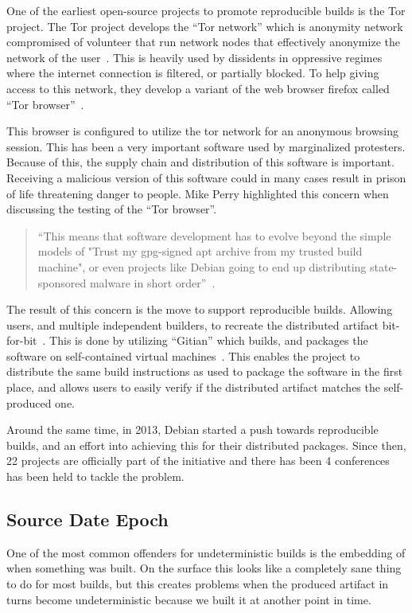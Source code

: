 \documentclass[../Main/thesis.tex]{subfiles}
\begin{document}
One of the earliest open-source projects to promote reproducible builds is the
Tor project. The Tor project develops the ``Tor network'' which is anonymity
network compromised of volunteer that run network nodes that effectively
anonymize the network of the user~\cite{tor}. This is heavily used by dissidents
in oppressive regimes where the internet connection is filtered, or partially
blocked. To help giving access to this network, they develop a variant of the
web browser firefox called ``Tor browser''~\cite{tor-browser}.

This browser is configured to utilize the tor network for an anonymous browsing
session. This has been a very important software used by marginalized
protesters. Because of this, the supply chain and distribution of this software
is important. Receiving a malicious version of this software could in many cases
result in prison of life threatening danger to people. Mike Perry highlighted
this concern when discussing the testing of the ``Tor browser''.

\begin{quotation}
``This means that software development has to evolve beyond the simple models of
"Trust my gpg-signed apt archive from my trusted build machine", or even
projects like Debian going to end up distributing state-sponsored malware in
short order''~\cite{mike-perry-2013}.
\end{quotation}


The result of this concern is the move to support reproducible builds. Allowing
users, and multiple independent builders, to recreate the distributed artifact
bit-for-bit~\cite{unknown-2014}. This is done by utilizing ``Gitian'' which
builds, and packages the software on self-contained virtual
machines~\cite{gitian}. This enables the project to distribute the same build
instructions as used to package the software in the first place, and allows
users to easily verify if the distributed artifact matches the self-produced
one.


Around the same time, in 2013, Debian started a push towards reproducible
builds, and an effort into achieving this for their distributed packages. Since
then, 22 projects are officially part of the initiative and there has been 4
conferences has been held to tackle the problem.

\subsection*{Source Date Epoch}
One of the most common offenders for undeterministic builds is the embedding of
when something was built. On the surface this looks like a completely sane thing
to do for most builds, but this creates problems when the produced artifact in
turns become undeterministic because we built it at another point in time.
\end{document}
